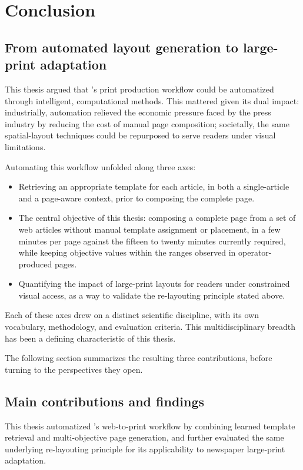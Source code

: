 \chapter{Conclusion}
\label{ref:conclusion}

\section{From automated layout generation to large-print adaptation}

This thesis argued that \melody's print production workflow could be automatized through intelligent, computational methods. This mattered given its dual impact: industrially, automation relieved the economic pressure faced by the press industry by reducing the cost of manual page composition; societally, the same spatial-layout techniques could be repurposed to serve readers under visual limitations. 

Automating this workflow unfolded along three axes:
\begin{itemize}
    \item Retrieving an appropriate template for each article, in both a single-article and a page-aware context, prior to composing the complete page.
    \item The central objective of this thesis: composing a complete page from a set of web articles without manual template assignment or placement, in a few minutes per page against the fifteen to twenty minutes currently required, while keeping objective values within the ranges observed in operator-produced pages.
    \item Quantifying the impact of large-print layouts for readers under constrained visual access, as a way to validate the re-layouting principle stated above.
\end{itemize}
Each of these axes drew on a distinct scientific discipline, with its own vocabulary, methodology, and evaluation criteria. This multidisciplinary breadth has been a defining characteristic of this thesis.

The following section summarizes the resulting three contributions, before turning to the perspectives they open.

\section{Main contributions and findings}
This thesis automatized \melody's web-to-print workflow by combining learned template retrieval and multi-objective page generation, and further evaluated the same underlying re-layouting principle for its applicability to newspaper large-print adaptation.

